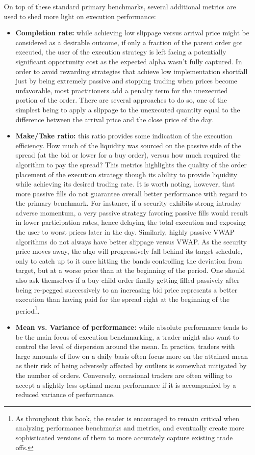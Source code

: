 On top of these standard primary benchmarks, several additional metrics are used to shed more light on execution performance:
\begin{itemize}
\item \textbf{Completion rate:} while achieving low slippage versus arrival price might be considered as a desirable outcome, if only a fraction of the parent order got executed, the user of the execution strategy is left facing a potentially significant opportunity cost as the expected alpha wasn't fully captured. In order to avoid rewarding strategies that achieve low implementation shortfall just by being extremely passive and stopping trading when prices become unfavorable, most practitioners add a penalty term for the unexecuted portion of the order. There are several approaches to do so, one of the simplest being to apply a slippage to the unexecuted quantity equal to the difference between the arrival price and the close price of the day. 
\item \textbf{Make/Take ratio:} this ratio provides some indication of the execution efficiency. How much of the liquidity was sourced on the passive side of the spread (at the bid or lower for a buy order), versus how much required the algorithm to pay the spread? This metrics highlights the quality of the order placement of the execution strategy though its ability to provide liquidity while achieving its desired trading rate. It is worth noting, however, that more passive fills do not guarantee overall better performance with regard to the primary benchmark. For instance, if a security exhibits strong intraday adverse momentum, a very passive strategy favoring passive fills would result in lower participation rates, hence delaying the total execution and exposing the user to worst prices later in the day. Similarly, highly passive VWAP algorithms do not always have better slippage versus VWAP. As the security price moves away, the algo will progressively fall behind its target schedule, only to catch up to it once hitting the bands controlling the deviation from target, but at a worse price than at the beginning of the period.
One should also ask themselves if a buy child order finally getting filled passively after being re-pegged successively to an increasing bid price represents a better execution than having paid for the spread right at the beginning of the period\footnote{As throughout this book, the reader is encouraged to remain critical when analyzing performance benchmarks and metrics, and eventually create more sophisticated versions of them to more accurately capture existing trade offs.}. 
\item \textbf{Mean vs. Variance of performance:} while absolute performance tends to be the main focus of execution benchmarking, a trader might also want to control the level of dispersion around the mean. In practice, traders with large amounts of flow on a daily basis often focus more on the attained mean as their risk of being adversely affected by outliers is somewhat mitigated by the number of orders. Conversely, occasional traders are often willing to accept a slightly less optimal mean performance if it is accompanied by a reduced variance of performance.
\end{itemize}

